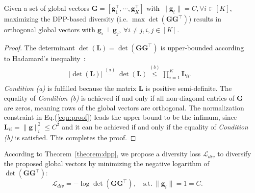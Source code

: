\documentclass[runningheads]{llncs}
\begin{document}
\begin{theorem}\label{theorem:dpp}
Given a set of global vectors $\boldsymbol{G}=[\boldsymbol{g}_1^\top,\cdots,\boldsymbol{g}_K^\top ]$ with $\|\boldsymbol{g}_i\|=C, \forall i\in [K]$,  maximizing the DPP-based diversity (i.e. $\max \operatorname{det}(\boldsymbol{G}\boldsymbol{G}^{\top})$) results in orthogonal global vectors with $\boldsymbol{g}_i \perp \boldsymbol{g}_j, \  \forall i \neq j,i,j \in [K]$.     
\end{theorem}
\begin{proof}
    The determinant $\operatorname{det}(\boldsymbol{L}) = \operatorname{det}(\boldsymbol{G}\boldsymbol{G}^{\top} )$ is upper-bounded according to Hadamard's inequality~\cite{petersen2008matrix}:
    \begin{equation}
    \begin{split}
         &|\operatorname{det}(\boldsymbol{L})|  \overset{(a)}= \operatorname{det}(\boldsymbol{L}) \overset{(b)} \leq \prod_{i=1}^{K} \boldsymbol{L}_{ii}. \\ 
    \end{split}
    \label{eqn:proof}
    \end{equation}
      \textit{Condition (a)}  is fulfilled because the matrix $\boldsymbol{L}$ is positive semi-definite. The equality of \textit{Condition (b)} is achieved if and only if all non-diagonal entries of $\boldsymbol{G}$ are zeros, meaning rows of the global vectors are orthogonal.
    The normalization constraint in Eq.(\ref{eqn:proof}) leads the upper bound to be the infimum, since  $\boldsymbol{L}_{ii}=\|\boldsymbol{g}\|_i^2\leq C^2$ and it can be achieved if and only if the equality of \textit{Condition (b)} is satisfied.  
    This completes the proof.
\end{proof}
According to Theorem~\ref{theorem:dpp}, we propose a diversity loss $\mathcal{L}_{div}$ to diversify the proposed global vectors by minimizing the negative logarithm of $\operatorname{det}(\boldsymbol{G}\boldsymbol{G}^{\top})$: 
\begin{equation}
    \mathcal{L}_{div}= -\log\operatorname{det}(\boldsymbol{G}\boldsymbol{G}^{\top}),\quad \text{s.t.} \  \|\boldsymbol{g}_i\|=1=C.
    \label{eqn:div_loss}
\end{equation}
\end{document}

